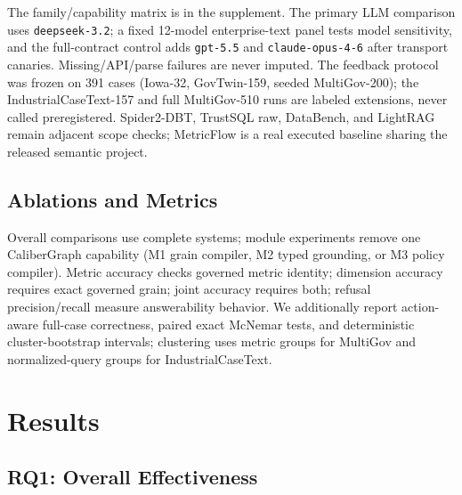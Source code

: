 \documentclass[letterpaper]{article}
\begin{document}
The family/capability matrix is in the supplement. The primary LLM comparison uses \texttt{deepseek-3.2}; a fixed 12-model enterprise-text panel tests model sensitivity, and the full-contract control adds \texttt{gpt-5.5} and \texttt{claude-opus-4-6} after transport canaries. Missing/API/parse failures are never imputed. The feedback protocol was frozen on 391 cases (Iowa-32, GovTwin-159, seeded MultiGov-200); the IndustrialCaseText-157 and full MultiGov-510 runs are labeled extensions, never called preregistered. Spider2-DBT, TrustSQL raw, DataBench, and LightRAG remain adjacent scope checks; MetricFlow is a real executed baseline sharing the released semantic project.

\subsection{Ablations and Metrics}

Overall comparisons use complete systems; module experiments remove one CaliberGraph capability (M1 grain compiler, M2 typed grounding, or M3 policy compiler). Metric accuracy checks governed metric identity; dimension accuracy requires exact governed grain; joint accuracy requires both; refusal precision/recall measure answerability behavior. We additionally report action-aware full-case correctness, paired exact McNemar tests, and deterministic cluster-bootstrap intervals; clustering uses metric groups for MultiGov and normalized-query groups for IndustrialCaseText.

\section{Results}

\subsection{RQ1: Overall Effectiveness}
\end{document}
